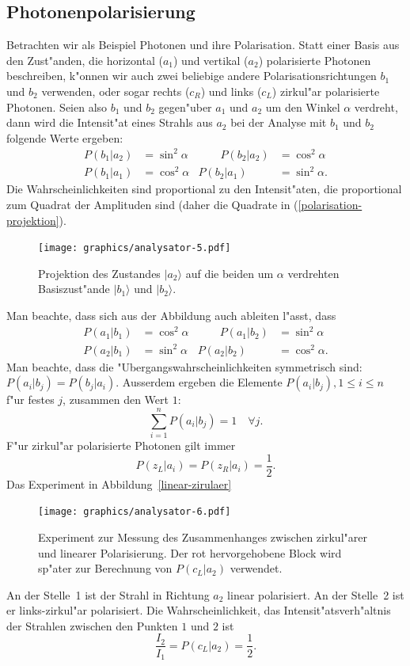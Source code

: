 \subsection{Photonenpolarisierung}
Betrachten wir als Beispiel Photonen und ihre Polarisation. 
Statt einer Basis aus den Zust"anden, die horizontal ($a_1$) und vertikal
($a_2$) polarisierte Photonen beschreiben, k"onnen wir auch zwei 
beliebige andere Polarisationsrichtungen $b_1$ und $b_2$ verwenden,
oder sogar rechts ($c_R$) und links ($c_L$) zirkul"ar polarisierte Photonen.
Seien also $b_1$ und $b_2$ gegen"uber $a_1$ und $a_2$ um den Winkel
$\alpha$ verdreht, dann wird die Intensit"at eines Strahls aus $a_2$
bei der Analyse mit $b_1$ und $b_2$ folgende Werte ergeben:
\begin{equation}
\begin{aligned}
P(b_1|a_2)&=\sin^2\alpha
&\qquad
P(b_2|a_2)&=\cos^2\alpha
\\
P(b_1|a_1)&=\cos^2\alpha
&
P(b_2|a_1)&=\sin^2\alpha.
\end{aligned}
\label{polarisation-projektion}
\end{equation}
Die Wahrscheinlichkeiten sind proportional zu den Intensit"aten,
die proportional zum Quadrat der Amplituden sind (daher die Quadrate
in (\ref{polarisation-projektion}).
\begin{figure}
\centering
\texttt{[image: graphics/analysator-5.pdf]}
\caption{Projektion des Zustandes $|a_2\rangle$ auf die beiden
um $\alpha$ verdrehten Basiszust"ande $|b_1\rangle$ und $|b_2\rangle$.
\label{polarisation-rotation}}
\end{figure}
Man beachte, dass sich aus der Abbildung auch ableiten l"asst, dass
\begin{equation}
\begin{aligned}
P(a_1|b_1)&=\cos^2\alpha
&\qquad
P(a_1|b_2)&=\sin^2\alpha
\\
P(a_2|b_1)&=\sin^2\alpha
&
P(a_2|b_2)&=\cos^2\alpha.
\end{aligned}
\label{polarisation-projektion-inverse}
\end{equation}
Man beachte, dass die "Ubergangswahrscheinlichkeiten
symmetrisch sind: $P(a_i|b_j)=P(b_j|a_i)$.
Ausserdem ergeben die Elemente $P(a_i|b_j), 1\le i\le n$ f"ur festes $j$,
zusammen den Wert $1$:
\[
\sum_{i=1}^nP(a_i|b_j)=1\quad\forall j.
\]
F"ur zirkul"ar polarisierte Photonen gilt immer 
\[
P(z_L|a_i)=P(z_R|a_i)=\frac12.
\]
Das Experiment in Abbildung~\ref{linear-zirulaer} 
\begin{figure}
\centering
\texttt{[image: graphics/analysator-6.pdf]}
\caption{Experiment zur Messung des Zusammenhanges zwischen zirkul"arer
und linearer Polarisierung. Der rot hervorgehobene Block wird sp"ater
zur Berechnung von $P(c_L|a_2)$ verwendet.
\label{linear-zirkulaer}}
\end{figure}
An der Stelle~1 ist der Strahl in Richtung $a_2$ linear polarisiert.
An der Stelle~2 ist er links-zirkul"ar polarisiert. Die Wahrscheinlichkeit,
das Intensit"atsverh"altnis der Strahlen zwischen den Punkten $1$ und $2$
ist
\begin{equation}
\frac{I_2}{I_1}=P(c_L|a_2)=\frac12.
\label{intensitaetsverhaeltnis}
\end{equation}

